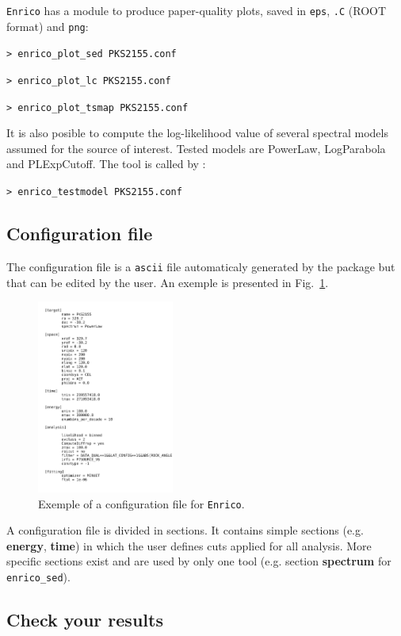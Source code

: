 \documentclass[a4paper]{article}
\begin{document}
{\tt Enrico} has a module to produce paper-quality plots, saved in {\tt eps}, {\tt .C} (ROOT format) and {\tt png}:

\mbox{{\tt> enrico\_plot\_sed PKS2155.conf}}

\mbox{{\tt> enrico\_plot\_lc PKS2155.conf}}

\mbox{{\tt> enrico\_plot\_tsmap PKS2155.conf}}


It is also posible to compute the log-likelihood value of several spectral
models assumed for the source of interest. Tested models are PowerLaw,
LogParabola and PLExpCutoff. The tool is called by :

\mbox{{\tt> enrico\_testmodel PKS2155.conf}}


\subsection{Configuration file}
The configuration file is a {\tt ascii} file automaticaly generated by the
package but that can be edited by the user. An exemple is presented in
Fig.~\ref{fig:conf}.

 \begin{figure}[!t]
  \centering
  \includegraphics[width=0.4\textwidth]{icrc2013_89_03}
  \caption{Exemple of a configuration file for {\tt Enrico}.}
  \label{fig:conf}
 \end{figure}

A configuration file is divided in sections. It contains simple sections (e.g.
\textbf{energy}, \textbf{time}) in which the user defines cuts applied for all
analysis. More specific sections exist and are used by only one tool (e.g.
section \textbf{spectrum} for {\tt enrico\_sed}).


\subsection{Check your results}
\end{document}

